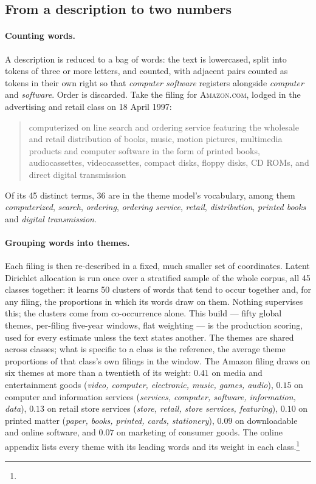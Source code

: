 \subsection{From a description to two numbers}\label{sec:definitions}

\paragraph{Counting words.} A description is reduced to a bag of words: the
text is lowercased, split into tokens of three or more letters, and counted,
with adjacent pairs counted as tokens in their own right so that
\emph{computer software} registers alongside \emph{computer} and
\emph{software}. Order is discarded. Take the filing for \textsc{Amazon.com},
lodged in the advertising and retail class on 18 April 1997:

\begin{quote}\small
computerized on line search and ordering service featuring the wholesale and
retail distribution of books, music, motion pictures, multimedia products and
computer software in the form of printed books, audiocassettes,
videocassettes, compact disks, floppy disks, CD ROMs, and direct digital
transmission
\end{quote}

\noindent Of its 45 distinct terms, 36 are in the theme model's vocabulary,
among them \emph{computerized}, \emph{search}, \emph{ordering},
\emph{ordering service}, \emph{retail}, \emph{distribution}, \emph{printed
books} and \emph{digital transmission}.

\paragraph{Grouping words into themes.} Each filing is then re-described in a
fixed, much smaller set of coordinates. Latent Dirichlet allocation is run
once over a stratified sample of the whole corpus, all 45 classes together: it
learns 50 clusters of words that tend to occur together and, for any filing,
the proportions in which its words draw on them. Nothing supervises this; the
clusters come from co-occurrence alone. This build --- fifty global themes,
per-filing five-year windows, flat weighting --- is the production scoring,
used for every estimate unless the text states another. The themes are
shared across classes;
what is specific to a class is the reference, the average theme proportions
of that class's own filings in the window. The Amazon filing draws on six
themes at more than a twentieth of its weight: $0.41$ on media and
entertainment goods (\emph{video, computer, electronic, music, games,
audio}), $0.15$ on computer and information services (\emph{services,
computer, software, information, data}), $0.13$ on retail store services
(\emph{store, retail, store services, featuring}), $0.10$ on printed matter
(\emph{paper, books, printed, cards, stationery}), $0.09$ on downloadable and
online software, and $0.07$ on marketing of consumer goods. The online
appendix lists every theme with its leading words and its weight in each
class.\footnote{\onlineappendixnote}

